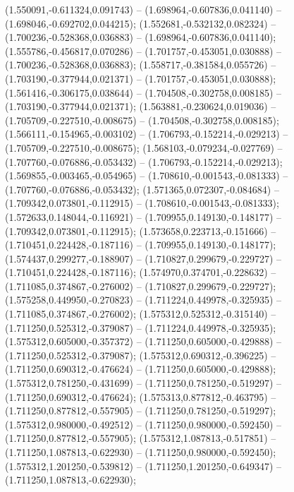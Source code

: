  (1.550091,-0.611324,0.091743) -- (1.698964,-0.607836,0.041140) -- (1.698046,-0.692702,0.044215);
 (1.552681,-0.532132,0.082324) -- (1.700236,-0.528368,0.036883) -- (1.698964,-0.607836,0.041140);
 (1.555786,-0.456817,0.070286) -- (1.701757,-0.453051,0.030888) -- (1.700236,-0.528368,0.036883);
 (1.558717,-0.381584,0.055726) -- (1.703190,-0.377944,0.021371) -- (1.701757,-0.453051,0.030888);
 (1.561416,-0.306175,0.038644) -- (1.704508,-0.302758,0.008185) -- (1.703190,-0.377944,0.021371);
 (1.563881,-0.230624,0.019036) -- (1.705709,-0.227510,-0.008675) -- (1.704508,-0.302758,0.008185);
 (1.566111,-0.154965,-0.003102) -- (1.706793,-0.152214,-0.029213) -- (1.705709,-0.227510,-0.008675);
 (1.568103,-0.079234,-0.027769) -- (1.707760,-0.076886,-0.053432) -- (1.706793,-0.152214,-0.029213);
 (1.569855,-0.003465,-0.054965) -- (1.708610,-0.001543,-0.081333) -- (1.707760,-0.076886,-0.053432);
 (1.571365,0.072307,-0.084684) -- (1.709342,0.073801,-0.112915) -- (1.708610,-0.001543,-0.081333);
 (1.572633,0.148044,-0.116921) -- (1.709955,0.149130,-0.148177) -- (1.709342,0.073801,-0.112915);
 (1.573658,0.223713,-0.151666) -- (1.710451,0.224428,-0.187116) -- (1.709955,0.149130,-0.148177);
 (1.574437,0.299277,-0.188907) -- (1.710827,0.299679,-0.229727) -- (1.710451,0.224428,-0.187116);
 (1.574970,0.374701,-0.228632) -- (1.711085,0.374867,-0.276002) -- (1.710827,0.299679,-0.229727);
 (1.575258,0.449950,-0.270823) -- (1.711224,0.449978,-0.325935) -- (1.711085,0.374867,-0.276002);
 (1.575312,0.525312,-0.315140) -- (1.711250,0.525312,-0.379087) -- (1.711224,0.449978,-0.325935);
 (1.575312,0.605000,-0.357372) -- (1.711250,0.605000,-0.429888) -- (1.711250,0.525312,-0.379087);
 (1.575312,0.690312,-0.396225) -- (1.711250,0.690312,-0.476624) -- (1.711250,0.605000,-0.429888);
 (1.575312,0.781250,-0.431699) -- (1.711250,0.781250,-0.519297) -- (1.711250,0.690312,-0.476624);
 (1.575313,0.877812,-0.463795) -- (1.711250,0.877812,-0.557905) -- (1.711250,0.781250,-0.519297);
 (1.575312,0.980000,-0.492512) -- (1.711250,0.980000,-0.592450) -- (1.711250,0.877812,-0.557905);
 (1.575312,1.087813,-0.517851) -- (1.711250,1.087813,-0.622930) -- (1.711250,0.980000,-0.592450);
 (1.575312,1.201250,-0.539812) -- (1.711250,1.201250,-0.649347) -- (1.711250,1.087813,-0.622930);
